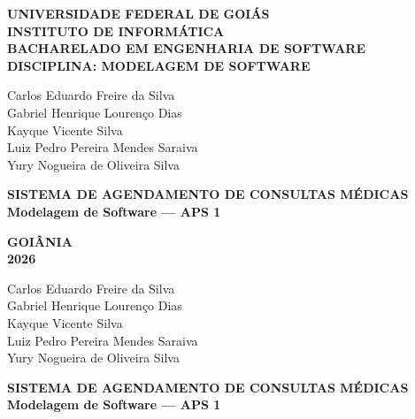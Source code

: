 \documentclass[12pt,a4paper]{article}
\begin{document}

\begin{titlepage}
  \thispagestyle{empty}
  \begin{center}
    \textbf{\large UNIVERSIDADE FEDERAL DE GOIÁS}\\[0.2cm]
    \textbf{\large INSTITUTO DE INFORMÁTICA}\\[0.2cm]
    \textbf{\large BACHARELADO EM ENGENHARIA DE SOFTWARE}\\[0.2cm]
    \textbf{\large DISCIPLINA: MODELAGEM DE SOFTWARE}

    \vspace{3.2cm}
    {\large
    Carlos Eduardo Freire da Silva\\
    Gabriel Henrique Lourenço Dias\\
    Kayque Vicente Silva\\
    Luiz Pedro Pereira Mendes Saraiva\\
    Yury Nogueira de Oliveira Silva\par}

    \vspace{3.5cm}
    \textbf{\Large SISTEMA DE AGENDAMENTO DE CONSULTAS MÉDICAS}\\[0.4cm]
    \textbf{\large Modelagem de Software --- APS 1}\par

    \vfill
    \textbf{GOIÂNIA}\\[0.2cm]
    \textbf{2026}
  \end{center}
\end{titlepage}

\thispagestyle{empty}
\begin{center}
  {\large
  Carlos Eduardo Freire da Silva\\
  Gabriel Henrique Lourenço Dias\\
  Kayque Vicente Silva\\
  Luiz Pedro Pereira Mendes Saraiva\\
  Yury Nogueira de Oliveira Silva\par}

  \vspace{4.0cm}
  \textbf{\Large SISTEMA DE AGENDAMENTO DE CONSULTAS MÉDICAS}\\[0.4cm]
  \textbf{\large Modelagem de Software --- APS 1}\par
\end{center}
\end{document}
